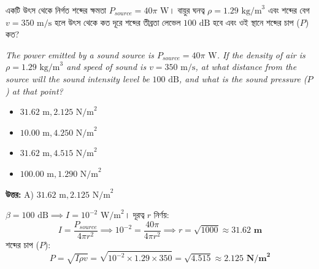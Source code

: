 \documentclass[12pt, a4paper]{article}
\begin{document}
\vspace{2em}

\begin{tcolorbox}[questionbox={প্রশ্ন (Question) 8}]
    \noindent
    একটি উৎস থেকে নির্গত শব্দের ক্ষমতা $P_{source} = 40\pi\text{ W}$। বায়ুর ঘনত্ব $\rho = 1.29\text{ kg/m}^3$ এবং শব্দের বেগ $v = 350\text{ m/s}$ হলে উৎস থেকে কত দূরে শব্দের তীব্রতা লেভেল $100\text{ dB}$ হবে এবং ওই স্থানে শব্দের চাপ ($P$) কত?
    
    \vspace{0.8em}
    \begin{english}
    \noindent\textit{\color{darkgray}
    The power emitted by a sound source is $P_{source} = 40\pi\text{ W}$. If the density of air is $\rho = 1.29\text{ kg/m}^3$ and speed of sound is $v = 350\text{ m/s}$, at what distance from the source will the sound intensity level be $100\text{ dB}$, and what is the sound pressure ($P$) at that point?
    }
    \end{english}
\end{tcolorbox}

\begin{itemize}[label={}, leftmargin=1cm, itemsep=0.5em]
    \item[\textbf{A)}] $31.62\text{ m}, 2.125\text{ N/m}^2$
    \item[\textbf{B)}] $10.00\text{ m}, 4.250\text{ N/m}^2$
    \item[\textbf{C)}] $31.62\text{ m}, 4.515\text{ N/m}^2$
    \item[\textbf{D)}] $100.00\text{ m}, 1.290\text{ N/m}^2$
\end{itemize}

\vspace{0.5em}
\begin{tcolorbox}[answerbox]
    \textbf{\color{success} উত্তর:} A) $31.62\text{ m}, 2.125\text{ N/m}^2$
\end{tcolorbox}
\vspace{1em}

\begin{tcolorbox}[solutionbox={সমাধান (Solution)}]
    \noindent
    $\beta = 100\text{ dB} \implies I = 10^{-2}\text{ W/m}^2$। দূরত্ব $r$ নির্ণয়:
    \[ I = \frac{P_{source}}{4\pi r^2} \implies 10^{-2} = \frac{40\pi}{4\pi r^2} \implies r = \sqrt{1000} \approx \mathbf{31.62\text{ m}} \]
    শব্দের চাপ ($P$):
    \[ P = \sqrt{I \rho v} = \sqrt{10^{-2} \times 1.29 \times 350} = \sqrt{4.515} \approx \mathbf{2.125\text{ N/m}^2} \]
\end{tcolorbox}
\end{document}
